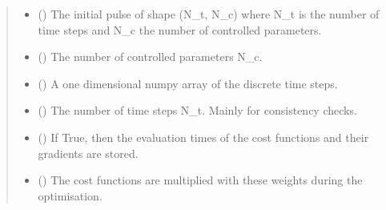\documentclass[letterpaper,10pt,english]{sphinxmanual}
\begin{document}
\begin{fulllineitems}
\begin{quote}
\begin{description}
\begin{itemize}
\item {} 
 (\sphinxstyleliteralemphasis{\sphinxupquote{, }}) \textendash{} The initial pulse of shape (N\_t, N\_c) where N\_t is the
number of time steps and N\_c the number of controlled parameters.

\item {} 
 (\sphinxstyleliteralemphasis{\sphinxupquote{, }}) \textendash{} The number of controlled parameters N\_c.

\item {} 
 (\sphinxstyleliteralemphasis{\sphinxupquote{, }}) \textendash{} A one dimensional numpy array of the discrete time steps.

\item {} 
 (\sphinxstyleliteralemphasis{\sphinxupquote{, }}) \textendash{} The number of time steps N\_t. Mainly for consistency checks.

\item {} 
 () \textendash{} If True, then the evaluation times of the cost functions and their
gradients are stored.

\item {} 
 (\sphinxstyleliteralemphasis{\sphinxupquote{, }}) \textendash{} The cost functions are multiplied with these weights during the
optimisation.

\end{itemize}

\end{description}\end{quote}


\end{fulllineitems}
\end{document}

